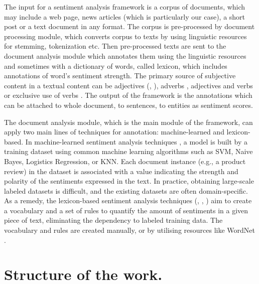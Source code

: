 	The input for a sentiment analysis framework is a corpus of documents, which may include a web page, news articles (which is particularly our case), a short post or a text document in any format. The corpus is pre-processed by document processing module, which converts corpus to texts by using linguistic resources for stemming, tokenization etc. Then pre-processed texts are sent to the document analysis module which annotates them using the linguistic resources and sometimes with a dictionary of words, called lexicon, which includes annotations of word's sentiment strength. The primary source of subjective content in a textual content can be adjectives (\cite{H1997}, \cite{H2004}), adverbs \cite{B2007}, adjectives and verbs \cite{K2004} or exclusive use of verbs \cite{S2008}. The output of the framework is the annotations which can be attached to whole document, to sentences, to entities as sentiment scores.
	
	The document analysis module, which is the main module of the framework, can apply two main lines of techniques for annotation: machine-learned and lexicon-based. In machine-learned sentiment analysis techniques \cite{P2002}, a model is built by a training dataset using common machine learning algorithms such as SVM, Naive Bayes, Logistics Regression, or KNN. Each document instance (e.g., a product review) in the dataset is associated with a value indicating the strength and polarity of the sentiments expressed in the text. In practice, obtaining large-scale labeled datasets is difficult, and the existing datasets are often domain-specific. As a remedy, the lexicon-based sentiment analysis techniques (\cite{B2010}, \cite{T2010}, \cite{TB2011}) aim to create a vocabulary and a set of rules to quantify the amount of sentiments in a given piece of text, eliminating the dependency to labeled training data. The vocabulary and rules are created manually, or by utilising resources like WordNet \cite{M1995}.
	
		
	\section{Structure of the work.}

